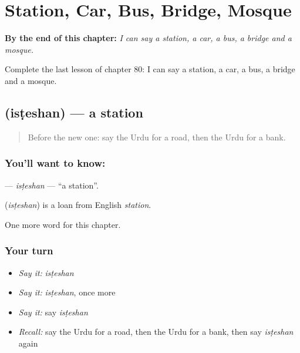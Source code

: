 
\chapter{Station, Car, Bus, Bridge, Mosque}
\label{ch:ur-station-car-bus-bridge-mosque}

\begin{chapteropening}
\textbf{By the end of this chapter:} \emph{I can say a station, a car, a bus, a bridge and a mosque.}

Complete the last lesson of chapter 80: I can say a station, a car, a bus, a bridge and a mosque.
\end{chapteropening}

\section[\texorpdfstring{\ur{اسٹیشن} (isṭeshan)}{اسٹیشن (isṭeshan)}]{ (isṭeshan) — a station}

\label{lesson:UR-C80-isteshan}



\begin{quote}
Before the new one: say the Urdu for a road, then the Urdu for a bank.
\end{quote}

\subsection*{You'll want to know: }
\textbf{} — \emph{isṭeshan} — \textquotedblleft{}a station\textquotedblright{}.

\begin{cousinweb}
\textbf{} (\emph{isṭeshan}) is a loan from English \emph{station}.
\end{cousinweb}

\begin{grammarlens}[title={What you've built}]
One more word for this chapter.
\end{grammarlens}

\subsection*{Your turn}
\begin{itemize}
\raggedright
  \item \emph{Say it:} \emph{isṭeshan}
  \item \emph{Say it:} \emph{isṭeshan}, once more
  \item \emph{Say it:} say \emph{isṭeshan}
  \item \emph{Recall:} say the Urdu for a road, then the Urdu for a bank, then say \emph{isṭeshan} again
\end{itemize}

